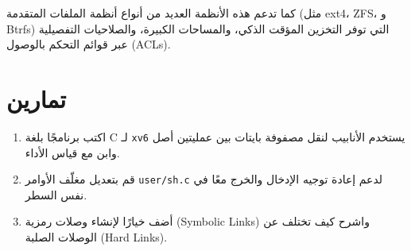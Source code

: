 كما تدعم هذه الأنظمة العديد من أنواع أنظمة الملفات المتقدمة (مثل ext4، ZFS، و Btrfs) التي توفر التخزين المؤقت الذكي، والمساحات الكبيرة، والصلاحيات التفصيلية عبر قوائم التحكم بالوصول (ACLs).

\section{تمارين}
\label{sec:exercises}

\begin{enumerate}
  \item اكتب برنامجًا بلغة C لـ \texttt{xv6} يستخدم الأنابيب لنقل مصفوفة بايتات بين عمليتين أصل وابن مع قياس الأداء.
  \item قم بتعديل مغلّف الأوامر \texttt{user/sh.c} لدعم إعادة توجيه الإدخال والخرج معًا في نفس السطر.
  \item أضف خيارًا لإنشاء وصلات رمزية (Symbolic Links) واشرح كيف تختلف عن الوصلات الصلبة (Hard Links).
\end{enumerate}
